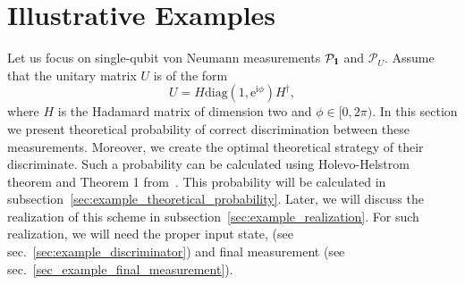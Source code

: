 \documentclass[preprint,12pt, a4paper]{elsarticle}
\newcommand{\1}{{\rm 1\hspace{-0.9mm}l}}
\newcommand{\ee}{\ensuremath{\mathrm{e}}}
\newcommand{\ii}{\ensuremath{\mathrm{i}}}
\newcommand{\PP}{\mathcal{P}}
\newcommand{\diag}{\mathrm{diag}}
\begin{document}
\section{Illustrative Examples}

Let us focus on single-qubit von Neumann measurements $\PP_\1$ and $\PP_U$.
Assume that the unitary matrix $U$ is of the form 
\begin{equation}
U = H \diag (1, \ee^{\ii \phi}) H^\dagger,
\end{equation}
where $H$ is the Hadamard matrix of dimension two and $\phi \in [0, 2 \pi)$.
In this section we present theoretical probability of correct 
discrimination between these measurements. Moreover, we create the optimal theoretical strategy of their discriminate. 
Such a probability can be calculated using Holevo-Helstrom theorem and 
Theorem 1 from~\cite{puchala2018strategies}. 
This probability will be calculated in 
subsection~\ref{sec:example_theoretical_probability}. Later, we will 
discuss the realization of this scheme in 
subsection~\ref{sec:example_realization}. For such realization, we 
will need the proper input state, (see sec.~\ref{sec:example_discriminator}) 
and final measurement (see sec.~\ref{sec_example_final_measurement}). 
\end{document}
